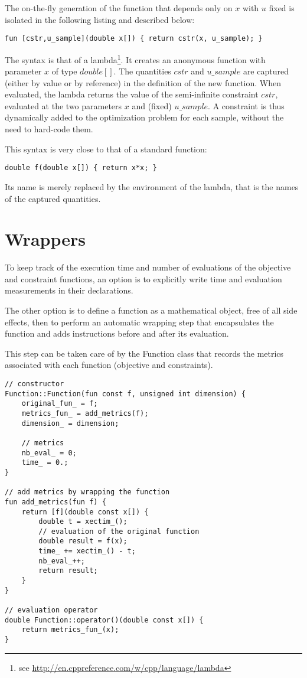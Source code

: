 \documentclass[11pt,twoside]{book}
\begin{document}
The on-the-fly generation of the function that depends only on $x$ with
$u$ fixed is isolated in the following listing and described below:

\begin{lstlisting}[style=base]
fun [cstr,u_sample](double x[]) { return cstr(x, u_sample); }
\end{lstlisting}

The syntax is that of a lambda\footnote{see
\url{http://en.cppreference.com/w/cpp/language/lambda}}. It creates an
anonymous function with parameter $x$ of type $\mathit{double[]}$. The
quantities $\mathit{cstr}$ and $\mathit{u\_sample}$ are captured (either
by value or by reference) in the definition of the new function. When
evaluated, the lambda returns the value of the semi-infinite constraint
$cstr$, evaluated at the two parameters $x$ and (fixed)
$\mathit{u\_sample}$. A constraint is thus dynamically added to the
optimization problem for each sample, without the need to hard-code them.

This syntax is very close to that of a standard function:
\begin{lstlisting}[style=base]
double f(double x[]) { return x*x; }
\end{lstlisting}

Its name is merely replaced by the environment of the lambda, that is
the names of the captured quantities.

\section{Wrappers}

To keep track of the execution time and number of evaluations of the
objective and constraint functions, an option is to explicitly write
time and evaluation measurements in their declarations.

The other option is to define a function as a mathematical object,
free of all side effects, then to perform an automatic wrapping step
that encapsulates the function and adds instructions before and after
its evaluation.

This step can be taken care of by the Function class that records the
metrics associated with each function (objective and constraints).

\begin{lstlisting}[style=base]
// constructor
Function::Function(fun const f, unsigned int dimension) {
    original_fun_ = f;
    metrics_fun_ = add_metrics(f);
    dimension_ = dimension;
    
    // metrics
    nb_eval_ = 0;
    time_ = 0.;
}

// add metrics by wrapping the function
fun add_metrics(fun f) {
	return [f](double const x[]) {
		double t = xectim_();
		// evaluation of the original function
		double result = f(x);
		time_ += xectim_() - t;
		nb_eval_++;
		return result;
	}
}

// evaluation operator
double Function::operator()(double const x[]) {
    return metrics_fun_(x);
}
\end{lstlisting}
\end{document}
